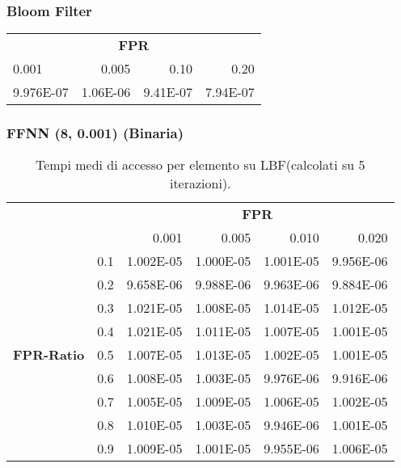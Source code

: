 \documentclass[4apaper,11pt]{report}
\begin{document}
    \subsubsection{Bloom Filter}

    \begin{table}[H]
        \centering
        \begin{tabular}{lrrr}
        \toprule
        \multicolumn{4}{c}{\textbf{FPR}}\\
        0.001 & 0.005 & 0.10 & 0.20\\
        \midrule 
        9.976E-07 & 1.06E-06 & 9.41E-07 & 7.94E-07\\
        \bottomrule

        \end{tabular}
    \end{table}
    
    \subsubsection{FFNN (8, 0.001) (Binaria)}

    \begin{table}[H]
        \centering
        \begin{tabular}{llrrrr}
        \toprule
        {} & & \multicolumn{4}{c}{\textbf{FPR}}\\
        {} & &    0.001 &     0.005 &     0.010 &     0.020 \\
        \midrule
        \multirow{9}{*}{\textbf{FPR-Ratio}} & 0.1& 1.002E-05 & 1.000E-05 & 1.001E-05 & 9.956E-06 \\
        &0.2& 9.658E-06 & 9.988E-06 & 9.963E-06 & 9.884E-06 \\
        &0.3& 1.021E-05 & 1.008E-05 & 1.014E-05 & 1.012E-05 \\
        &0.4& 1.021E-05 & 1.011E-05 & 1.007E-05 & 1.001E-05 \\
        &0.5& 1.007E-05 & 1.013E-05 & 1.002E-05 & 1.001E-05 \\
        &0.6& 1.008E-05 & 1.003E-05 & 9.976E-06 & 9.916E-06 \\
        &0.7& 1.005E-05 & 1.009E-05 & 1.006E-05 & 1.002E-05 \\
        &0.8& 1.010E-05 & 1.003E-05 & 9.946E-06 & 1.001E-05 \\
        &0.9& 1.009E-05 & 1.001E-05 & 9.955E-06 & 1.006E-05 \\
        \bottomrule
        \end{tabular}
        \caption{Tempi medi di accesso per elemento su LBF(calcolati su 5 iterazioni).}
    \end{table}
\end{document}

